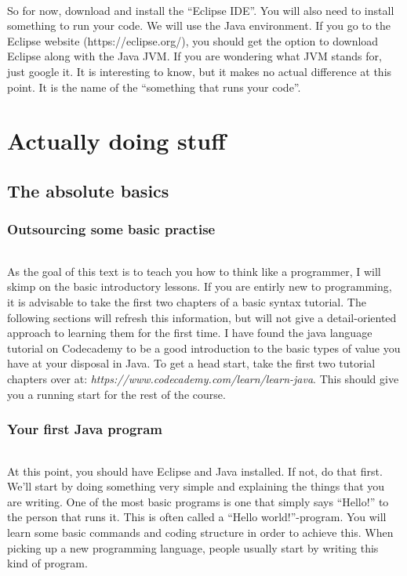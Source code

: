 \documentclass[11pt,fleqn]{book} %
\begin{document}
\paragraph{}So for now, download and install the ``Eclipse IDE''. You will also need to install something to run your code. We will use the Java environment. If you go to the Eclipse website (https://eclipse.org/), you should get the option to download Eclipse along with the Java JVM. If you are wondering what JVM stands for, just google it. It is interesting to know, but it makes no actual difference at this point. It is the name of the ``something that runs your code''.


\part{Actually doing stuff}

\chapter{The absolute basics}

\section{Outsourcing some basic practise}
\paragraph{}As the goal of this text is to teach you how to think like a programmer, I will skimp on the basic introductory lessons.
If you are entirly new to programming, it is advisable to take the first two chapters of a basic syntax tutorial.
The following sections will refresh this information, but will not give a detail-oriented approach to learning them for the first time.
I have found the java language tutorial on Codecademy to be a good introduction to the basic types of value you have at your disposal in Java.
To get a head start, take the first two tutorial chapters over at: \emph{https://www.codecademy.com/learn/learn-java}. 
This should give you a running start for the rest of the course.

\section{Your first Java program}
\paragraph{}At this point, you should have Eclipse and Java installed. If not, do that first.
We'll start by doing something very simple and explaining the things that you are writing.
One of the most basic programs is one that simply says ``Hello!'' to the person that runs it. This is often called a ``Hello world!''-program.
You will learn some basic commands and coding structure in order to achieve this. When picking up a new programming language, people usually start by writing this kind of program.
\end{document}
